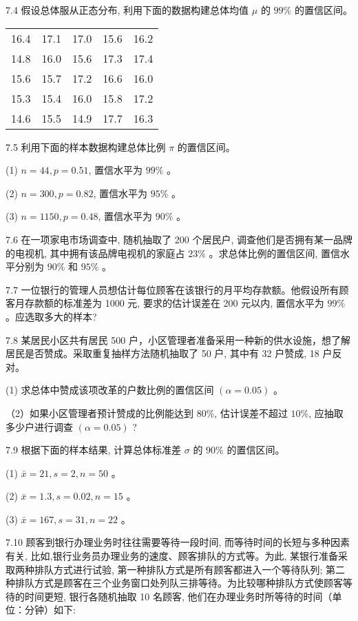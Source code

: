 \documentclass[10pt]{article}
\begin{document}
\begin{CJK*}{UTF8}{bsmi}
7.4 假设总体服从正态分布, 利用下面的数据构建总体均值 $\mu$ 的 $99 \%$ 的置信区间。

\begin{center}
\begin{tabular}{lllll}
\hline
16.4 & 17.1 & 17.0 & 15.6 & 16.2 \\
14.8 & 16.0 & 15.6 & 17.3 & 17.4 \\
15.6 & 15.7 & 17.2 & 16.6 & 16.0 \\
15.3 & 15.4 & 16.0 & 15.8 & 17.2 \\
14.6 & 15.5 & 14.9 & 17.7 & 16.3 \\
\hline
\end{tabular}
\end{center}

7.5 利用下面的样本数据构建总体比例 $\pi$ 的置信区间。

(1) $n=44, p=0.51$, 置信水平为 $99 \%$ 。

(2) $n=300, p=0.82$, 置信水平为 $95 \%$ 。

(3) $n=1150, p=0.48$, 置信水平为 $90 \%$ 。

7.6 在一项家电市场调查中, 随机抽取了 200 个居民户, 调查他们是否拥有某一品牌的电视机, 其中拥有该品牌电视机的家庭占 $23 \%$ 。求总体比例的置信区间, 置信水平分别为 $90 \%$ 和 $95 \%$ 。

7.7 一位银行的管理人员想估计每位顾客在该银行的月平均存款额。他假设所有顾客月存款额的标准差为 1000 元, 要求的估计误差在 200 元以内, 置信水平为 $99 \%$ 。应选取多大的样本?

7.8 某居民小区共有居民 500 户，小区管理者准备采用一种新的供水设施，想了解居民是否赞成。采取重复抽样方法随机抽取了 50 户, 其中有 32 户赞成, 18 户反对。

(1) 求总体中赞成该项改革的户数比例的置信区间 $(\alpha=0.05)$ 。

（2）如果小区管理者预计赞成的比例能达到 $80 \%$, 估计误差不超过 $10 \%$, 应抽取多少户进行调查 $(\alpha=0.05)$ ?

7.9 根据下面的样本结果, 计算总体标准差 $\sigma$ 的 $90 \%$ 的置信区间。

(1) $\bar{x}=21, s=2, n=50$ 。

(2) $\bar{x}=1.3, s=0.02, n=15$ 。

(3) $\bar{x}=167, s=31, n=22$ 。

7.10 顾客到银行办理业务时往往需要等待一段时间, 而等待时间的长短与多种因素有关, 比如,银行业务员办理业务的速度、顾客排队的方式等。为此, 某银行准备采取两种排队方式进行试验, 第一种排队方式是所有顾客都进入一个等待队列; 第二种排队方式是顾客在三个业务窗口处列队三排等待。为比较哪种排队方式使顾客等待的时间更短, 银行各随机抽取 10 名顾客, 他们在办理业务时所等待的时间（单位：分钟）如下:


\end{CJK*}
\end{document}
